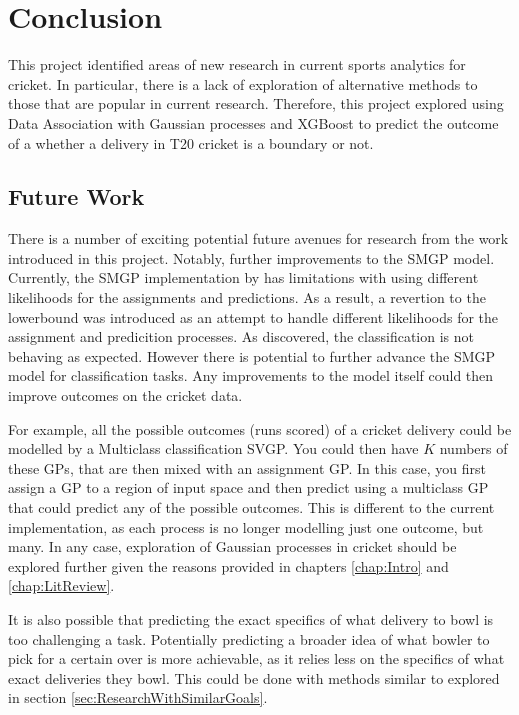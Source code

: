 \documentclass[12pt,a4paper]{report}
\theoremstyle{definition}
\begin{document}
\chapter{Conclusion}

This project identified areas of new research in current sports analytics for cricket.
In particular, there is a lack of exploration of alternative methods to those that are popular in current research.
Therefore, this project explored using Data Association with Gaussian processes and XGBoost to predict the outcome of a whether a delivery in T20 cricket is a boundary or not.

\section{Future Work}

There is a number of exciting potential future avenues for research from the work introduced in this project.
Notably, further improvements to the SMGP model.
Currently, the SMGP implementation by \citet{Lui2021} has limitations with using different likelihoods for the assignments and predictions.
As a result, a revertion to the \citet{Kaiser2020} lowerbound was introduced as an attempt to handle different likelihoods for the assignment and predicition processes.
As discovered, the classification is not behaving as expected.
However there is potential to further advance the SMGP model for classification tasks.
Any improvements to the model itself could then improve outcomes on the cricket data.

For example, all the possible outcomes (runs scored) of a cricket delivery could be modelled by a Multiclass classification SVGP.
You could then have $K$ numbers of these GPs, that are then mixed with an assignment GP.
In this case, you first assign a GP to a region of input space and then predict using a multiclass GP that could predict any of the possible outcomes.
This is different to the current implementation, as each process is no longer modelling just one outcome, but many.
In any case, exploration of Gaussian processes in cricket should be explored further given the reasons provided in chapters \ref{chap:Intro} and \ref{chap:LitReview}.

It is also possible that predicting the exact specifics of what delivery to bowl is too challenging a task.
Potentially predicting a broader idea of what bowler to pick for a certain over is more achievable, as it relies less on the specifics of what exact deliveries they bowl.
This could be done with methods similar to \citet{silver2021baseball} explored in section \ref{sec:ResearchWithSimilarGoals}.
\end{document}
